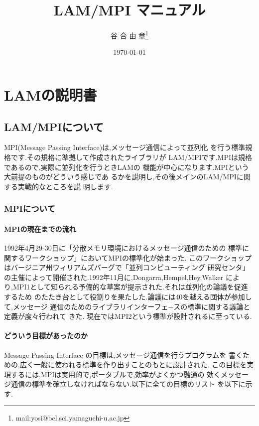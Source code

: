 \documentclass[a4paper,titlepage]{jreport}
\begin{document}

\title{LAM/MPI マニュアル} %
\date{\today}
\author{谷 合 由 章\thanks{mail:yosi@bcl.sci.yamaguchi-u.ac.jp}}
\maketitle %

\tableofcontents %

\newpage %

\part{LAMの説明書}

\chapter{LAM/MPIについて \label{app:LAM}}
MPI(Message Passing Interface)は,メッセージ通信によって並列化
を行う標準規格です.その規格に準拠して作成されたライブラリが
LAM/MPIです.MPIは規格であるので,実際に並列化を行うときLAMの
機能が中心になります.MPIという大前提のものがどういう感じであ
るかを説明し,その後メインのLAM/MPIに関する実戦的なところを説
明します.

\section{MPIについて}

\subsection{MPIの現在までの流れ}
1992年4月29-30日に「分散メモリ環境におけるメッセージ通信のための
標準に関するワークショップ」においてMPIの標準化が始まった.
このワークショップはバージニア州ウィリアムズバーグで「並列コンピューティング
研究センタ」の主催によって開催された.1992年11月に,Dongarra,Hempel,Hey,Walker
により,MPI1として知られる予備的な草案が提示された.それは並列化の論議を促進
するため
のたたき台として役割りを果たした.論議には40を越える団体が参加して,メッセージ
通信のためのライブラリインターフェ−スの標準に関する議論と定義が度々行われて
きた.  現在ではMPI2という標準が設計されるに至っている.

\subsection{どういう目標があったのか}
Message Passing Interface の目標は,メッセージ通信を行うプログラムを
書くための,広く一般に使われる標準を作り出すことのもとに設計された.
この目標を実現するには,MPIは実用的で,ポータブルで,効率がよくかつ融通の
効くメッセージ通信の標準を確立しなければならない.以下に全ての目標のリスト
を以下に示す.
\end{document}
